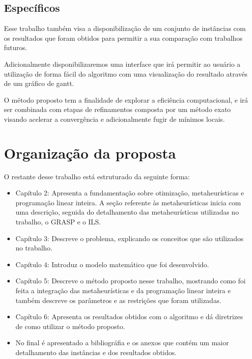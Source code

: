 \subsection{Específicos}

Esse trabalho também visa a disponibilização de um conjunto de instâncias com
os resultados que foram obtidos para permitir a sua comparação com trabalhos
futuros.

Adicionalmente disponibilizaremos uma interface que irá permitir ao usuário a
utilização de forma fácil do algoritmo com uma visualização do resultado através
de um gráfico de gantt.

O método proposto tem a finalidade de explorar a eficiência computacional, e irá
ser combinada com etapas de refinamentos composta por um método exato visando
acelerar a convergência e adicionalmente fugir de mínimos locais.

\section {Organização da proposta }

O restante desse trabalho está estruturado da seguinte forma:

\begin{itemize}

\item Capítulo 2: Apresenta a fundamentação sobre otimização, metaheurísticas
e programação linear inteira. A seção referente às metaheurísticas inicia
com uma descrição, seguida do detalhamento das metaheurísticas utilizadas no trabalho,
o GRASP e o ILS.


\item Capítulo 3: Descreve o problema, explicando os conceitos que são
utilizados no trabalho.

\item Capítulo 4: Introduz o modelo matemático que foi desenvolvido.

\item Capítulo 5: Descreve o método proposto nesse trabalho, mostrando como foi
feita a integração das metaheurísticas e da programação linear inteira e também descreve os parâmetros e as restrições que foram utilizadas.

\item Capítulo 6: Apresenta os resultados obtidos com o algoritmo e dá
diretrizes de como utilizar o método proposto.

\item No final é apresentado a bibliográfia e os anexos que contém um maior
detalhamento das instâncias e dos resultados obtidos.

\end{itemize}